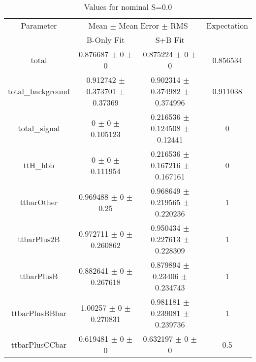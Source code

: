 \begin{table}
\centering
\caption{Values for nominal S=0.0}
\begin{tabular}{cccc}
\toprule
Parameter & \multicolumn{2}{c}{Mean $\pm$ Mean Error $\pm$ RMS} & Expectation\\
 & B-Only Fit & S+B Fit & \\
\midrule
total & \num{0.876687} $\pm$ \num{0} $\pm$ \num{0} & \num{0.875224} $\pm$ \num{0} $\pm$ \num{0} & \num{0.856534}\\
total\_background & \num{0.912742} $\pm$ \num{0.373701} $\pm$ \num{0.37369} & \num{0.902314} $\pm$ \num{0.374982} $\pm$ \num{0.374996} & \num{0.911038}\\
total\_signal & \num{0} $\pm$ \num{0} $\pm$ \num{0.105123} & \num{0.216536} $\pm$ \num{0.124508} $\pm$ \num{0.12441} & \num{0}\\
ttH\_hbb & \num{0} $\pm$ \num{0} $\pm$ \num{0.111954} & \num{0.216536} $\pm$ \num{0.167216} $\pm$ \num{0.167161} & \num{0}\\
ttbarOther & \num{0.969488} $\pm$ \num{0} $\pm$ \num{0.25} & \num{0.968649} $\pm$ \num{0.219565} $\pm$ \num{0.220236} & \num{1}\\
ttbarPlus2B & \num{0.972711} $\pm$ \num{0} $\pm$ \num{0.260862} & \num{0.950434} $\pm$ \num{0.227613} $\pm$ \num{0.228309} & \num{1}\\
ttbarPlusB & \num{0.882641} $\pm$ \num{0} $\pm$ \num{0.267618} & \num{0.879894} $\pm$ \num{0.23406} $\pm$ \num{0.234743} & \num{1}\\
ttbarPlusBBbar & \num{1.00257} $\pm$ \num{0} $\pm$ \num{0.270831} & \num{0.981181} $\pm$ \num{0.239081} $\pm$ \num{0.239736} & \num{1}\\
ttbarPlusCCbar & \num{0.619481} $\pm$ \num{0} $\pm$ \num{0} & \num{0.632197} $\pm$ \num{0} $\pm$ \num{0} & \num{0.5}\\
\bottomrule
\end{tabular}
\end{table}